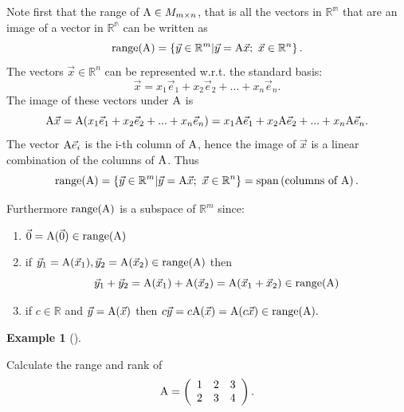 \documentclass[
  a4paper,
  DIV=11,
  numbers=noendperiod,
  oneside]{scrreprt}
\providecommand{\tightlist}{%
  \setlength{\itemsep}{0pt}\setlength{\parskip}{0pt}}
\theoremstyle{definition}
\newtheorem{example}{Example}[chapter]
\theoremstyle{remark}
\begin{document}
Note first that the range of \({\rm A}\in M_{m\times n}\), that is all
the vectors in \(\mathbb{R^m}\) that are an image of a vector in
\(\mathbb{R^n}\) can be written as
\[ {\rm range(A)} = \left\{ \vec{y} \in \mathbb{R}^m | \vec{y}={\rm A} \vec{x}; \ \vec{x} \in  \mathbb{R}^n \right\}. \]
The vectors \(\vec{x} \in \mathbb{R}^n\) can be represented w.r.t. the
standard basis:
\[  \vec{x} = x_1 \vec{e}_1 +  x_2 \vec{e}_2 + ... +  x_n \vec{e}_n. \]
The image of these vectors under \({\rm A}\) is
\[ {\rm A} \vec{x} = {\rm A} (x_1 \vec{e}_1 +  x_2 \vec{e}_2 + ... +  x_n \vec{e}_n) = x_1 {\rm A}\vec{e}_1 +  x_2 {\rm A}\vec{e}_2 + ... +  x_n {\rm A}\vec{e}_n.\]
The vector \({\rm A}\vec{e}_i\) is the i-th column of \({\rm A}\), hence
the image of \(\vec{x}\) is a linear combination of the columns of
\({\rm A}\). Thus
\[ {\rm range(A)} = \left\{ \vec{y} \in \mathbb{R}^m | \vec{y}={\rm A} \vec{x}; \ \vec{x} \in  \mathbb{R}^n \right\} = {\rm span} \left(\text{columns of A} \right).\]

Furthermore \({\rm range(A)}\) is a subspace of \(\mathbb{R}^m\) since:

\begin{enumerate}
\def\labelenumi{\arabic{enumi}.}
\tightlist
\item
  \(\vec{0} = {\rm A} (\vec{0}) \in {\rm range(A)}\)
\item
  if
  \(\vec{y}_1={\rm A} (\vec{x}_1), \vec{y}_2 = {\rm A} (\vec{x}_2) \in {\rm range(A)}\)
  then
  \[\vec{y}_1 + \vec{y}_2 = {\rm A} (\vec{x}_1)+{\rm A} (\vec{x}_2) = {\rm A} (\vec{x}_1 + \vec{x}_2) \in {\rm range(A)}\]
\item
  if \(c\in \mathbb{R}\) and \(\vec{y}={\rm A} (\vec{x})\) then
  \(c \vec{y}= c {\rm A} (\vec{x}) = {\rm A} (c \vec{x}) \in {\rm range(A)}.\)
\end{enumerate}

\begin{example}[]\protect\hypertarget{exm-}{}\label{exm-}

Calculate the range and rank of \[ {\rm A} = \left(\begin{array}{ccc}
            1 & 2 & 3 \\
            2 & 3 & 4 
        \end{array}\right).\]

\end{example}
\end{document}
